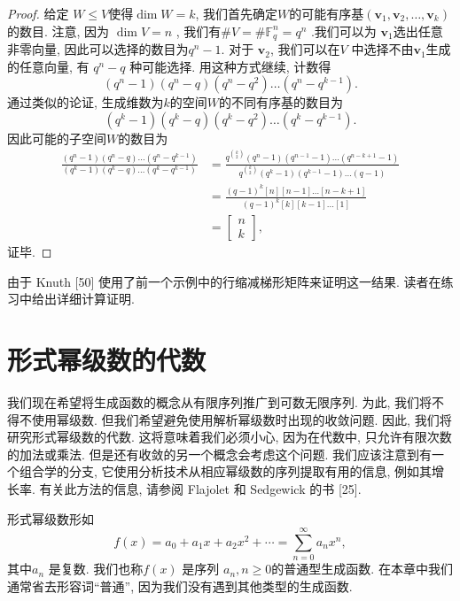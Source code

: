 \documentclass[a4paper,12pt]{ctexbook}
\begin{document}
 \begin{proof}
 	给定 $W \leq V$使得$\operatorname{dim} W=k$, 我们首先确定$W$的可能有序基$\left(\mathbf{v}_{1}, \mathbf{v}_{2}, \ldots, \mathbf{v}_{k}\right)$ 的数目. 注意, 因为 $\operatorname{dim} V=n$ , 我们有$\# V=\# \mathbb{F}_{q}^{n}=q^{n} $ .我们可以为 $\mathbf{v}_{1}$选出任意非零向量, 因此可以选择的数目为$q^{n}-1$. 对于 $\mathbf{v}_{2}$, 我们可以在$V$ 中选择不由$\mathbf{v}_{1}$生成的任意向量, 有 $q^{n}-q$ 种可能选择. 用这种方式继续, 计数得
 	$$
 	\left(q^{n}-1\right)\left(q^{n}-q\right)\left(q^{n}-q^{2}\right) \ldots\left(q^{n}-q^{k-1}\right).
 	$$
 	通过类似的论证, 生成维数为$k$的空间$W$的不同有序基的数目为
 	$$
 	\left(q^{k}-1\right)\left(q^{k}-q\right)\left(q^{k}-q^{2}\right) \ldots\left(q^{k}-q^{k-1}\right).
 	$$因此可能的子空间$W$的数目为
 	$$\begin{aligned}
 		\frac{\left(q^{n}-1\right)\left(q^{n}-q\right) \ldots\left(q^{n}-q^{k-1}\right)}{\left(q^{k}-1\right)\left(q^{k}-q\right) \ldots\left(q^{k}-q^{k-1}\right)} & = \frac { q ^ {\binom{k}{2}} ( q ^ { n } - 1 ) ( q ^ { n - 1 } - 1 ) \ldots ( q ^ { n - k + 1 } - 1 ) } {q^{\binom{k}{2}} \left(q^{k}-1\right)\left(q^{k-1}-1\right) \ldots(q-1)} \\
 				&=\frac{(q-1)^{k}[n][n-1] \ldots[n-k+1]}{(q-1)^{k}[k][k-1] \ldots[1]} \\
 				&=\left[\begin{array}{c}
 					n \\
 					k
 				\end{array}\right],
 			\end{aligned}$$证毕.
 \end{proof}
由于 Knuth [50] 使用了前一个示例中的行缩减梯形矩阵来证明这一结果. 读者在练习中给出详细计算证明.
\section{形式幂级数的代数}

我们现在希望将生成函数的概念从有限序列推广到可数无限序列. 为此, 我们将不得不使用幂级数. 但我们希望避免使用解析幂级数时出现的收敛问题. 因此, 我们将研究形式幂级数的代数. 这将意味着我们必须小心, 因为在代数中, 只允许有限次数的加法或乘法. 但是还有收敛的另一个概念会考虑这个问题. 我们应该注意到有一个组合学的分支, 它使用分析技术从相应幂级数的序列提取有用的信息, 例如其增长率. 有关此方法的信息, 请参阅 Flajolet 和 Sedgewick 的书 [25].

{\kaishu 形式幂级数}形如
$$
f(x)=a_{0}+a_{1} x+a_{2} x^{2}+\cdots=\sum_{n=0}^{\infty} a_{n} x^{n},
$$
其中$a_{n}$ 是复数. 我们也称$f(x)$ 是序列 $a_{n}, n \geq 0$的{\kaishu 普通型生成函数}. 在本章中我们通常省去形容词“普通”, 因为我们没有遇到其他类型的生成函数.
\end{document}

